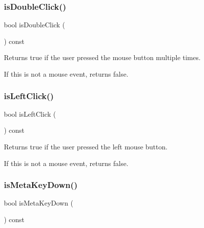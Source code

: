 \subsubsection{\texorpdfstring{is\+Double\+Click()}{isDoubleClick()}}
{\footnotesize\ttfamily bool is\+Double\+Click (\begin{DoxyParamCaption}{ }\end{DoxyParamCaption}) const\hspace{0.3cm}{\ttfamily [virtual]}}



Returns true if the user pressed the mouse button multiple times. 

If this is not a mouse event, returns false. \mbox{\label{classsgl_1_1GEvent_ae6b870593fd0c645b97f2382ac40253a}} 
\subsubsection{\texorpdfstring{is\+Left\+Click()}{isLeftClick()}}
{\footnotesize\ttfamily bool is\+Left\+Click (\begin{DoxyParamCaption}{ }\end{DoxyParamCaption}) const\hspace{0.3cm}{\ttfamily [virtual]}}



Returns true if the user pressed the left mouse button. 

If this is not a mouse event, returns false. \mbox{\label{classsgl_1_1GEvent_a37aa61a279efea6cb36cb5e6d8ada04c}} 
\subsubsection{\texorpdfstring{is\+Meta\+Key\+Down()}{isMetaKeyDown()}}
{\footnotesize\ttfamily bool is\+Meta\+Key\+Down (\begin{DoxyParamCaption}{ }\end{DoxyParamCaption}) const\hspace{0.3cm}{\ttfamily [virtual]}}



